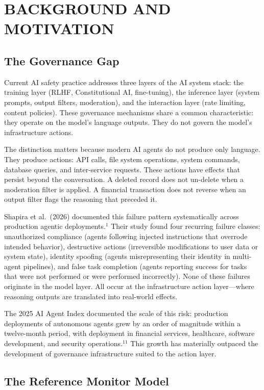 \documentclass{IEEEcsmag}
\begin{document}
\section{BACKGROUND AND MOTIVATION}

\subsection{The Governance Gap}

Current AI safety practice addresses three layers of the AI system stack: the training layer (RLHF, Constitutional AI, fine-tuning), the inference layer (system prompts, output filters, moderation), and the interaction layer (rate limiting, content policies). These governance mechanisms share a common characteristic: they operate on the model's language outputs. They do not govern the model's infrastructure actions.

The distinction matters because modern AI agents do not produce only language. They produce actions: API calls, file system operations, system commands, database queries, and inter-service requests. These actions have effects that persist beyond the conversation. A deleted record does not un-delete when a moderation filter is applied. A financial transaction does not reverse when an output filter flags the reasoning that preceded it.

Shapira et al.\ (2026) documented this failure pattern systematically across production agentic deployments.$^{1}$ Their study found four recurring failure classes: unauthorized compliance (agents following injected instructions that overrode intended behavior), destructive actions (irreversible modifications to user data or system state), identity spoofing (agents misrepresenting their identity in multi-agent pipelines), and false task completion (agents reporting success for tasks that were not performed or were performed incorrectly). None of these failures originate in the model layer. All occur at the infrastructure action layer---where reasoning outputs are translated into real-world effects.

The 2025 AI Agent Index documented the scale of this risk: production deployments of autonomous agents grew by an order of magnitude within a twelve-month period, with deployment in financial services, healthcare, software development, and security operations.$^{11}$ This growth has materially outpaced the development of governance infrastructure suited to the action layer.

\subsection{The Reference Monitor Model}
\end{document}

